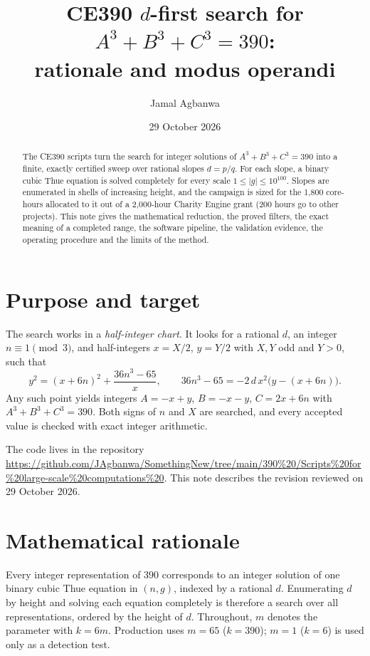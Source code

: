 \documentclass[11pt,a4paper]{article}
\title{CE390 $d$-first search for $A^3+B^3+C^3=390$:\\ rationale and modus operandi}
\author{Jamal Agbanwa}
\date{29 October 2026}
\begin{document}
\maketitle

\begin{abstract}
The CE390 scripts turn the search for integer solutions of $A^3+B^3+C^3=390$ into a finite,
exactly certified sweep over rational slopes $d=p/q$. For each slope, a binary cubic Thue
equation is solved completely for every scale $1\le|g|\le10^{100}$. Slopes are enumerated in
shells of increasing height, and the campaign is sized for the 1{,}800 core-hours allocated to it out of a
2{,}000-hour Charity Engine grant (200 hours go to other projects). This note gives the mathematical reduction, the proved filters, the
exact meaning of a completed range, the software pipeline, the validation evidence, the
operating procedure and the limits of the method.
\end{abstract}

\tableofcontents

\section{Purpose and target}

The search works in a \emph{half-integer chart}. It looks for a rational $d$, an integer
$n\equiv1\pmod 3$, and half-integers $x=X/2$, $y=Y/2$ with $X,Y$ odd and $Y>0$, such that
\begin{equation}\label{eq:target}
  y^2=(x+6n)^2+\frac{36n^3-65}{x},\qquad
  36n^3-65=-2\,d\,x^2\bigl(y-(x+6n)\bigr).
\end{equation}
Any such point yields integers $A=-x+y$, $B=-x-y$, $C=2x+6n$ with $A^3+B^3+C^3=390$.
Both signs of $n$ and $X$ are searched, and every accepted value is checked with exact
integer arithmetic.

The code lives in the repository
\url{https://github.com/JAgbanwa/SomethingNew/tree/main/390%20/Scripts%20for%20large-scale%20computations%20}.
This note describes the revision reviewed on 29 October 2026.

\section{Mathematical rationale}

Every integer representation of $390$ corresponds to an integer solution of one binary
cubic Thue equation in $(n,g)$, indexed by a rational $d$. Enumerating $d$ by height and
solving each equation completely is therefore a search over all representations, ordered
by the height of $d$. Throughout, $m$ denotes the parameter with $k=6m$. Production uses
$m=65$ ($k=390$); $m=1$ ($k=6$) is used only as a detection test.
\end{document}
